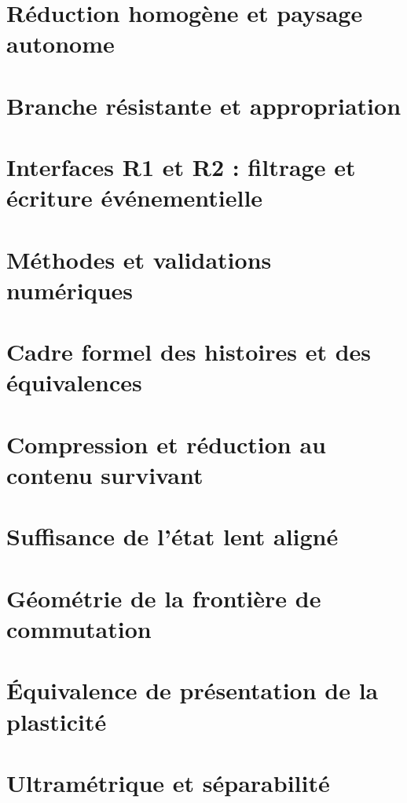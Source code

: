 \documentclass[
  11pt,
  a4paper,
  openany]{book}
\theoremstyle{definition}
\begin{document}
\chapter{Réduction homogène et paysage autonome}\label{annexe-reduction-homogene-paysage}


\chapter{Branche résistante et appropriation}\label{annexe-branche-resistante-appropriation}


\chapter{Interfaces R1 et R2 : filtrage et écriture événementielle}\label{annexe-interfaces-r1-r2}


\chapter{Méthodes et validations numériques}\label{annexe-methodes-validations-numeriques}


\chapter{Cadre formel des histoires et des équivalences}\label{annexe-histoires-equivalences}


\chapter{Compression et réduction au contenu survivant}\label{annexe-reduction-contenu-survivant}


\chapter{Suffisance de l'état lent aligné}\label{annexe-etat-lent-aligne}


\chapter{Géométrie de la frontière de commutation}\label{annexe-geometrie-frontiere-commutation}


\chapter{Équivalence de présentation de la plasticité}\label{annexe-equivalence-presentation-plasticite}


\chapter{Ultramétrique et séparabilité}\label{annexe-ultrametrique-separabilite}


\clearpage

\end{document}
